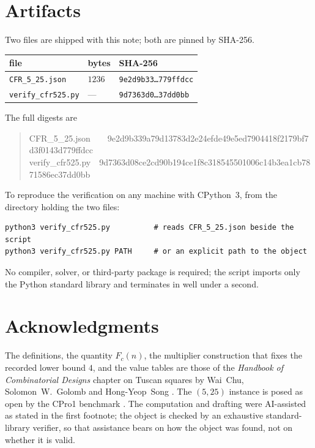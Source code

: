 \documentclass[11pt]{amsart}
\newcommand{\Fc}{F_{c}}
\theoremstyle{plain}
\theoremstyle{definition}
\theoremstyle{remark}
\begin{document}
\section{Artifacts}\label{sec:artifacts}

Two files are shipped with this note; both are pinned by SHA-256.
\begin{center}
\small
\begin{tabular}{lll}
\toprule
file & bytes & SHA-256\\
\midrule
\texttt{CFR\_5\_25.json} & $1236$ &
\texttt{9e2d9b33\ldots779ffdcc}\\
\texttt{verify\_cfr525.py} & --- &
\texttt{9d7363d0\ldots37dd0bb}\\
\bottomrule
\end{tabular}
\end{center}
\noindent The full digests are
\begin{quote}\ttfamily\footnotesize
CFR\_5\_25.json\ \ \ \ 9e2d9b339a79d13783d2e24efde49e5ed7904418f2179bf7d3f0143d779ffdcc\\
verify\_cfr525.py\ \ 9d7363d08ce2cd90b194ce1f8c318545501006c14b3ea1cb7871586ec37dd0bb
\end{quote}
To reproduce the verification on any machine with CPython~3, from the
directory holding the two files:
\begin{verbatim}
python3 verify_cfr525.py          # reads CFR_5_25.json beside the script
python3 verify_cfr525.py PATH     # or an explicit path to the object
\end{verbatim}
No compiler, solver, or third-party package is required; the script imports
only the Python standard library and terminates in well under a second.

\section*{Acknowledgments}

The definitions, the quantity $\Fc(n)$, the multiplier construction that fixes
the recorded lower bound $4$, and the value tables are those of the
\emph{Handbook of Combinatorial Designs} chapter on Tuscan squares by Wai~Chu,
Solomon~W.~Golomb and Hong-Yeop~Song \cite{HCD}. The $(5,25)$ instance is
posed as open by the CPro1 benchmark \cite{CPro1}. The computation and drafting
were AI-assisted as stated in the first footnote; the object is checked by an
exhaustive standard-library verifier, so that assistance bears on how the
object was found, not on whether it is valid.
\end{document}
